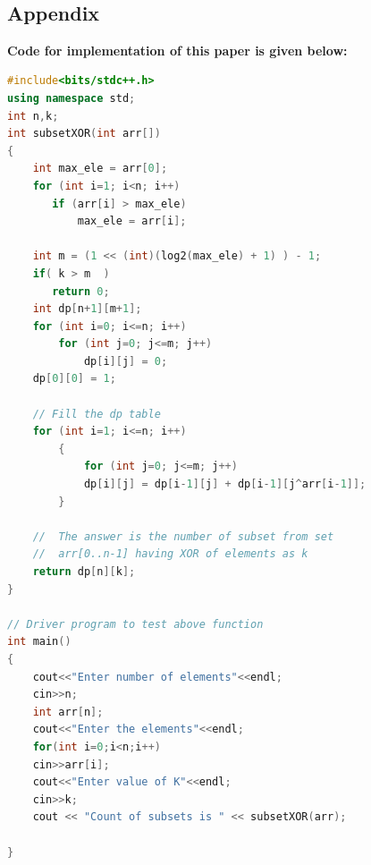 \documentclass[conference]{IEEEtran}
\begin{document}
\color{black}
\
\begin{titlepage}
    \begin{center}
        \Huge
        \section*{Appendix}
        \end{center}
         \textbf{Code for implementation of this paper is given below:}
\begin{lstlisting}[language=C++,caption=Code for this paper]
#include<bits/stdc++.h>
using namespace std;
int n,k;
int subsetXOR(int arr[])
{
    int max_ele = arr[0];
    for (int i=1; i<n; i++)
       if (arr[i] > max_ele)
           max_ele = arr[i];
 
    int m = (1 << (int)(log2(max_ele) + 1) ) - 1;
    if( k > m  )
       return 0;
    int dp[n+1][m+1];
    for (int i=0; i<=n; i++)
        for (int j=0; j<=m; j++)
            dp[i][j] = 0;
    dp[0][0] = 1;
 
    // Fill the dp table
    for (int i=1; i<=n; i++)
        {
            for (int j=0; j<=m; j++)
            dp[i][j] = dp[i-1][j] + dp[i-1][j^arr[i-1]];
        }
 
    //  The answer is the number of subset from set
    //  arr[0..n-1] having XOR of elements as k
    return dp[n][k];
}
 
// Driver program to test above function
int main()
{
    cout<<"Enter number of elements"<<endl;
    cin>>n;
    int arr[n];
    cout<<"Enter the elements"<<endl;
    for(int i=0;i<n;i++)
    cin>>arr[i];
    cout<<"Enter value of K"<<endl;
    cin>>k;
    cout << "Count of subsets is " << subsetXOR(arr);
    
}
   
\end{lstlisting}
\end{titlepage}
\end{document}
